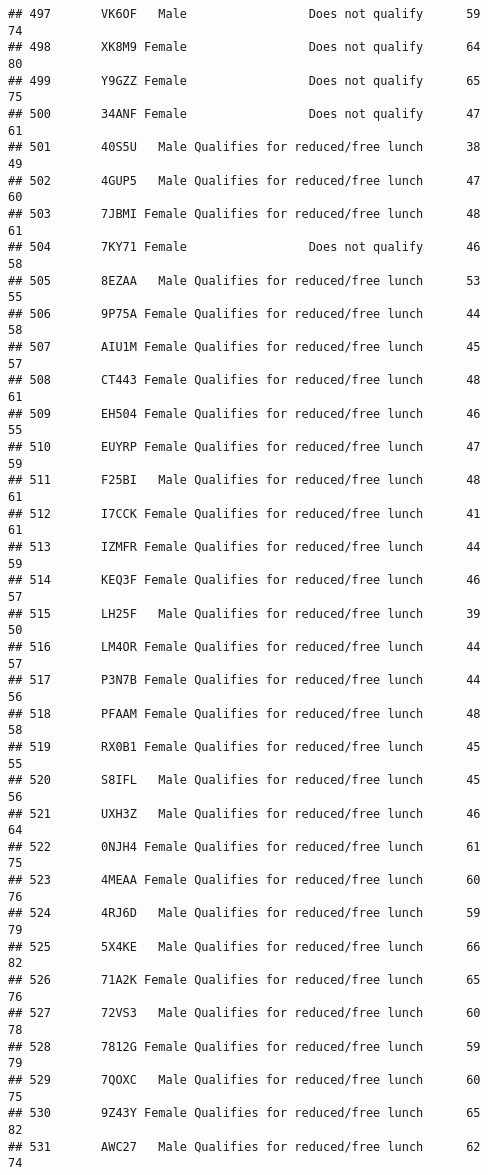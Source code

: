 \documentclass[
]{article}
\begin{document}
\begin{verbatim}
## 497       VK6OF   Male                 Does not qualify      59       74
## 498       XK8M9 Female                 Does not qualify      64       80
## 499       Y9GZZ Female                 Does not qualify      65       75
## 500       34ANF Female                 Does not qualify      47       61
## 501       40S5U   Male Qualifies for reduced/free lunch      38       49
## 502       4GUP5   Male Qualifies for reduced/free lunch      47       60
## 503       7JBMI Female Qualifies for reduced/free lunch      48       61
## 504       7KY71 Female                 Does not qualify      46       58
## 505       8EZAA   Male Qualifies for reduced/free lunch      53       55
## 506       9P75A Female Qualifies for reduced/free lunch      44       58
## 507       AIU1M Female Qualifies for reduced/free lunch      45       57
## 508       CT443 Female Qualifies for reduced/free lunch      48       61
## 509       EH504 Female Qualifies for reduced/free lunch      46       55
## 510       EUYRP Female Qualifies for reduced/free lunch      47       59
## 511       F25BI   Male Qualifies for reduced/free lunch      48       61
## 512       I7CCK Female Qualifies for reduced/free lunch      41       61
## 513       IZMFR Female Qualifies for reduced/free lunch      44       59
## 514       KEQ3F Female Qualifies for reduced/free lunch      46       57
## 515       LH25F   Male Qualifies for reduced/free lunch      39       50
## 516       LM4OR Female Qualifies for reduced/free lunch      44       57
## 517       P3N7B Female Qualifies for reduced/free lunch      44       56
## 518       PFAAM Female Qualifies for reduced/free lunch      48       58
## 519       RX0B1 Female Qualifies for reduced/free lunch      45       55
## 520       S8IFL   Male Qualifies for reduced/free lunch      45       56
## 521       UXH3Z   Male Qualifies for reduced/free lunch      46       64
## 522       0NJH4 Female Qualifies for reduced/free lunch      61       75
## 523       4MEAA Female Qualifies for reduced/free lunch      60       76
## 524       4RJ6D   Male Qualifies for reduced/free lunch      59       79
## 525       5X4KE   Male Qualifies for reduced/free lunch      66       82
## 526       71A2K Female Qualifies for reduced/free lunch      65       76
## 527       72VS3   Male Qualifies for reduced/free lunch      60       78
## 528       7812G Female Qualifies for reduced/free lunch      59       79
## 529       7QOXC   Male Qualifies for reduced/free lunch      60       75
## 530       9Z43Y Female Qualifies for reduced/free lunch      65       82
## 531       AWC27   Male Qualifies for reduced/free lunch      62       74

\end{verbatim}
\end{document}
